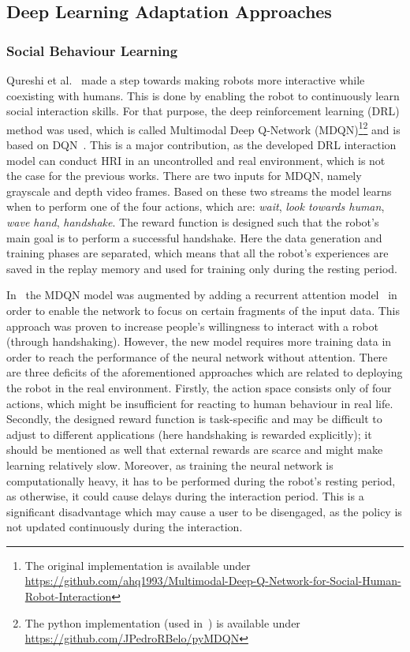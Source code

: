 \documentclass[thesis]{mas_proposal}
\begin{document}
\subsection{Deep Learning Adaptation Approaches}

\subsubsection{Social Behaviour Learning}
Qureshi et al.~\cite{Qureshi2016} made a step towards making robots more interactive while coexisting with humans. This is done by enabling the robot to continuously learn social interaction skills. For that purpose, the deep reinforcement learning (DRL) method was used, which is called Multimodal Deep Q-Network (MDQN)\footnote{The original implementation is available under \url{https://github.com/ahq1993/Multimodal-Deep-Q-Network-for-Social-Human-Robot-Interaction}}\footnote{The python implementation (used in~\cite{Belo2021}) is available under \url{https://github.com/JPedroRBelo/pyMDQN}} and is based on DQN~\cite{mnih2015human}. This is a major contribution, as the developed DRL interaction model can conduct HRI in an uncontrolled and real environment, which is not the case for the previous works. There are two inputs for MDQN, namely grayscale and depth video frames. Based on these two streams the model learns when to perform one of the four actions, which are: \emph{wait}, \emph{look towards human}, \emph{wave hand}, \emph{handshake}. The reward function is designed such that the robot's main goal is to perform a successful handshake. Here the data generation and training phases are separated, which means that all the robot's experiences are saved in the replay memory and used for training only during the resting period. 

In~\cite{Qureshi2017} the MDQN model was augmented by adding a recurrent attention model~\cite{sorokin2015deep} in order to enable the network to focus on certain fragments of the input data. This approach was proven to increase people's willingness to interact with a robot (through handshaking). However, the new model requires more training data in order to reach the performance of the neural network without attention. There are three deficits of the aforementioned approaches which are related to deploying the robot in the real environment. Firstly, the action space consists only of four actions, which might be insufficient for reacting to human behaviour in real life. Secondly, the designed reward function is task-specific and may be difficult to adjust to different applications (here handshaking is rewarded explicitly); it should be mentioned as well that external rewards are scarce and might make learning relatively slow. Moreover, as training the neural network is computationally heavy, it has to be performed during the robot's resting period, as otherwise, it could cause delays during the interaction period. This is a significant disadvantage which may cause a user to be disengaged, as the policy is not updated continuously during the interaction. 
\end{document}
